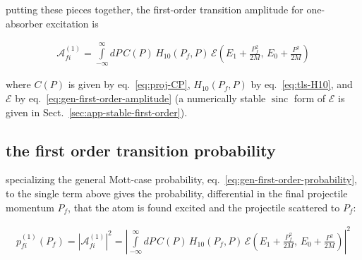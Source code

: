 putting these pieces together, the first-order transition amplitude for one-absorber excitation is
\begin{importantbox}
    \begin{align}
        \mathcal A_{fi}^{(1)} = \int\limits_{-\infty}^{\infty}dP\, C(P)\, H_{10}(P_f,P)\, \mathcal E\!\left(E_1+\frac{P_f^2}{2M},\,E_0+\frac{P^2}{2M}\right)\label{eq:tls-one-absorber-amplitude}
    \end{align}
\end{importantbox}
where $C(P)$ is given by eq.~\eqref{eq:proj-CP}, $H_{10}(P_f,P)$ by eq.~\eqref{eq:tls-H10}, and $\mathcal E$ by eq.~\eqref{eq:gen-first-order-amplitude} (a numerically stable $\operatorname{sinc}$ form of $\mathcal E$ is given in Sect.~\ref{sec:app-stable-first-order}).

\subsection{the first order transition probability}
specializing the general Mott-case probability, eq.~\eqref{eq:gen-first-order-probability}, to the single term above gives the probability, differential in the final projectile momentum $P_f$, that the atom is found excited and the projectile scattered to $P_f$:
\begin{importantbox}
    \begin{align}
        p_{fi}^{(1)}(P_f) = \left|\mathcal A_{fi}^{(1)}\right|^2 = \left|\int\limits_{-\infty}^{\infty}dP\, C(P)\, H_{10}(P_f,P)\, \mathcal E\!\left(E_1+\frac{P_f^2}{2M},\,E_0+\frac{P^2}{2M}\right)\right|^2\label{eq:tls-one-absorber-probability}
    \end{align}
\end{importantbox}

